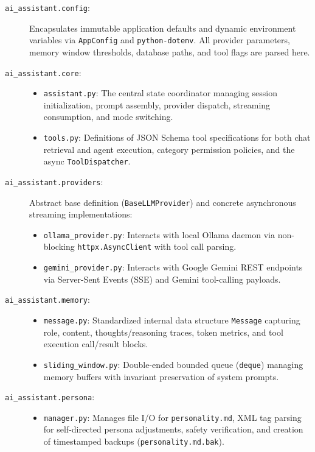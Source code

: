 \begin{description}
    \item[\texttt{ai\_assistant.config}:] Encapsulates immutable application defaults and dynamic environment variables via \texttt{AppConfig} and \texttt{python-dotenv}. All provider parameters, memory window thresholds, database paths, and tool flags are parsed here.
    \item[\texttt{ai\_assistant.core}:]
    \begin{itemize}
        \item \texttt{assistant.py}: The central state coordinator managing session initialization, prompt assembly, provider dispatch, streaming consumption, and mode switching.
        \item \texttt{tools.py}: Definitions of JSON Schema tool specifications for both chat retrieval and agent execution, category permission policies, and the async \texttt{ToolDispatcher}.
    \end{itemize}
    \item[\texttt{ai\_assistant.providers}:] Abstract base definition (\texttt{BaseLLMProvider}) and concrete asynchronous streaming implementations:
    \begin{itemize}
        \item \texttt{ollama\_provider.py}: Interacts with local Ollama daemon via non-blocking \texttt{httpx.AsyncClient} with tool call parsing.
        \item \texttt{gemini\_provider.py}: Interacts with Google Gemini REST endpoints via Server-Sent Events (SSE) and Gemini tool-calling payloads.
    \end{itemize}
    \item[\texttt{ai\_assistant.memory}:]
    \begin{itemize}
        \item \texttt{message.py}: Standardized internal data structure \texttt{Message} capturing role, content, thoughts/reasoning traces, token metrics, and tool execution call/result blocks.
        \item \texttt{sliding\_window.py}: Double-ended bounded queue (\texttt{deque}) managing memory buffers with invariant preservation of system prompts.
    \end{itemize}
    \item[\texttt{ai\_assistant.persona}:]
    \begin{itemize}
        \item \texttt{manager.py}: Manages file I/O for \texttt{personality.md}, XML tag parsing for self-directed persona adjustments, safety verification, and creation of timestamped backups (\texttt{personality.md.bak}).

\end{itemize}
\end{description}
